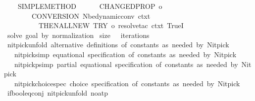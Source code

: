 \begin{isabellebody}
\ \ \ \ SIMPLE{\isacharunderscore}{\kern0pt}METHOD{\isacharprime}{\kern0pt}\isanewline
\ \ \ \ \ \ {\isacharparenleft}{\kern0pt}CHANGED{\isacharunderscore}{\kern0pt}PROP\ o\isanewline
\ \ \ \ \ \ \ \ {\isacharparenleft}{\kern0pt}CONVERSION\ {\isacharparenleft}{\kern0pt}Nbe{\isachardot}{\kern0pt}dynamic{\isacharunderscore}{\kern0pt}conv\ ctxt{\isacharparenright}{\kern0pt}\isanewline
\ \ \ \ \ \ \ \ \ \ THEN{\isacharunderscore}{\kern0pt}ALL{\isacharunderscore}{\kern0pt}NEW\ {\isacharparenleft}{\kern0pt}TRY\ o\ resolve{\isacharunderscore}{\kern0pt}tac\ ctxt\ {\isacharbrackleft}{\kern0pt}TrueI{\isacharbrackright}{\kern0pt}{\isacharparenright}{\kern0pt}{\isacharparenright}{\kern0pt}{\isacharparenright}{\kern0pt}{\isacharparenright}{\kern0pt}\isanewline
{\isacartoucheclose}\ {\isachardoublequoteopen}solve\ goal\ by\ normalization{\isachardoublequoteclose}%
\endisatagML
{\isafoldML}%
%
\isadelimML
%
\endisadelimML
%
\isadelimdocument
%
\endisadelimdocument
%
\isatagdocument
%
\isamarkuptrue%
%
\isamarkuptrue%
%
\endisatagdocument
{\isafolddocument}%
%
\isadelimdocument
%
\endisadelimdocument
{}\isamarkupfalse%
\ {\isacharbrackleft}{\kern0pt}size\ {\isacharequal}{\kern0pt}\ {}{\isacharcomma}{\kern0pt}\ iterations\ {\isacharequal}{\kern0pt}\ {}{}{\isacharbrackright}{\kern0pt}%
\isadelimdocument
%
\endisadelimdocument
%
\isatagdocument
%
\isamarkuptrue%
%
\endisatagdocument
{\isafolddocument}%
%
\isadelimdocument
%
\endisadelimdocument
{}\isamarkupfalse%
\ nitpick{\isacharunderscore}{\kern0pt}unfold\ {\isachardoublequoteopen}alternative\ definitions\ of\ constants\ as\ needed\ by\ Nitpick{\isachardoublequoteclose}\isanewline
\ \ \ nitpick{\isacharunderscore}{\kern0pt}simp\ {\isachardoublequoteopen}equational\ specification\ of\ constants\ as\ needed\ by\ Nitpick{\isachardoublequoteclose}\isanewline
\ \ \ nitpick{\isacharunderscore}{\kern0pt}psimp\ {\isachardoublequoteopen}partial\ equational\ specification\ of\ constants\ as\ needed\ by\ Nitpick{\isachardoublequoteclose}\isanewline
\ \ \ nitpick{\isacharunderscore}{\kern0pt}choice{\isacharunderscore}{\kern0pt}spec\ {\isachardoublequoteopen}choice\ specification\ of\ constants\ as\ needed\ by\ Nitpick{\isachardoublequoteclose}\isanewline
\isanewline
{}\isamarkupfalse%
\ if{\isacharunderscore}{\kern0pt}bool{\isacharunderscore}{\kern0pt}eq{\isacharunderscore}{\kern0pt}conj\ {\isacharbrackleft}{\kern0pt}nitpick{\isacharunderscore}{\kern0pt}unfold{\isacharcomma}{\kern0pt}\ no{\isacharunderscore}{\kern0pt}atp{\isacharbrackright}{\kern0pt}\isanewline

\end{isabellebody}
